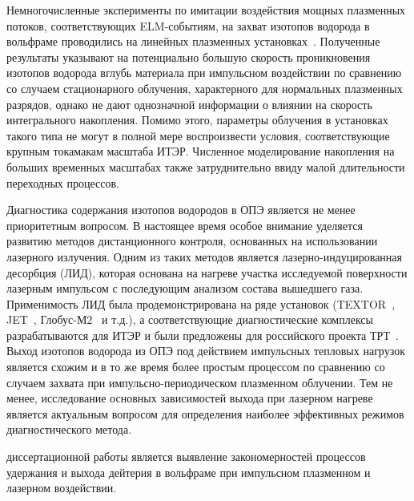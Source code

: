 Немногочисленные эксперименты по имитации воздействия мощных плазменных потоков, соответствующих ELM-событиям, на захват изотопов водорода в вольфраме проводились на линейных плазменных установках~\cite{Nishijima2011,Poskakalov2020,Ogorodnikova}. Полученные результаты указывают на потенциально большую скорость проникновения изотопов водорода вглубь материала при импульсном воздействии по сравнению со случаем стационарного облучения, характерного для нормальных плазменных разрядов, однако не дают однозначной информации о влиянии на скорость интегрального накопления. Помимо этого, параметры облучения в установках такого типа не могут в полной мере воспроизвести условия, соответствующие крупным токамакам масштаба ИТЭР. Численное моделирование накопления на больших временных масштабах также затруднительно ввиду малой длительности переходных процессов.

Диагностика содержания изотопов водородов в ОПЭ является не менее приоритетным вопросом. В настоящее время особое внимание уделяется развитию методов дистанционного контроля, основанных на использовании лазерного излучения. Одним из таких методов является лазерно-индуцированная десорбция (ЛИД), которая основана на нагреве участка исследуемой поверхности лазерным импульсом с последующим анализом состава вышедшего газа. Применимость ЛИД была продемонстрирована на ряде установок (TEXTOR~\cite{Schweer2009}, JET~\cite{Zlobinski2024}, Глобус-М2~\cite{Medvedev2024} и т.д.), а соответствующие диагностические комплексы разрабатываются для ИТЭР и были предложены для российского проекта ТРТ~\cite{Razdobarin2022}. Выход изотопов водорода из ОПЭ под действием импульсных тепловых нагрузок является схожим и в то же время более простым процессом по сравнению со случаем захвата при импульсно-периодическом плазменном облучении. Тем не менее, исследование основных зависимостей выхода при лазерном нагреве является актуальным вопросом для определения наиболее эффективных режимов диагностического метода.

{\aim} диссертационной работы является выявление закономерностей процессов удержания и выхода дейтерия в вольфраме при импульсном плазменном и лазерном воздействии.

